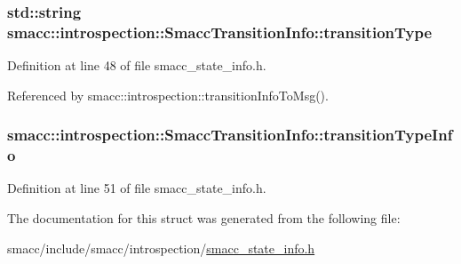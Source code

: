 \subsubsection[{\texorpdfstring{transition\+Type}{transitionType}}]{\setlength{\rightskip}{0pt plus 5cm}std\+::string smacc\+::introspection\+::\+Smacc\+Transition\+Info\+::transition\+Type}\hypertarget{structsmacc_1_1introspection_1_1SmaccTransitionInfo_a8f4682c18a3b6c09f6b942a4fa7b524d}{}\label{structsmacc_1_1introspection_1_1SmaccTransitionInfo_a8f4682c18a3b6c09f6b942a4fa7b524d}


Definition at line 48 of file smacc\+\_\+state\+\_\+info.\+h.



Referenced by smacc\+::introspection\+::transition\+Info\+To\+Msg().

\subsubsection[{\texorpdfstring{transition\+Type\+Info}{transitionTypeInfo}}]{ smacc\+::introspection\+::\+Smacc\+Transition\+Info\+::transition\+Type\+Info}\hypertarget{structsmacc_1_1introspection_1_1SmaccTransitionInfo_abe702ee8041ad32f2290b99c17ab9d95}{}\label{structsmacc_1_1introspection_1_1SmaccTransitionInfo_abe702ee8041ad32f2290b99c17ab9d95}


Definition at line 51 of file smacc\+\_\+state\+\_\+info.\+h.



The documentation for this struct was generated from the following file\+:\begin{DoxyCompactItemize}
\item 
smacc/include/smacc/introspection/\hyperlink{smacc__state__info_8h}{smacc\+\_\+state\+\_\+info.\+h}\end{DoxyCompactItemize}
